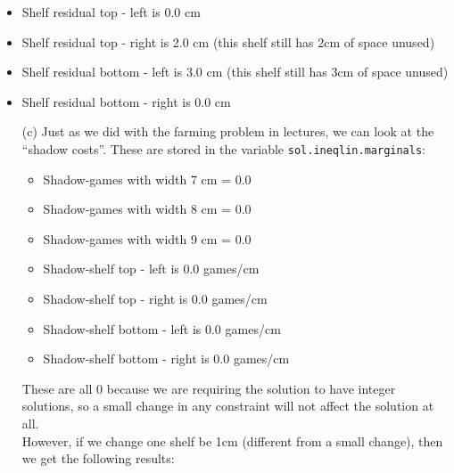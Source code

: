 \begin{enumerate}
\begin{itemize}
		\item Shelf residual  top - left  is  0.0 cm
		\item Shelf residual  top - right  is  2.0 cm \hfill (this shelf still has 2cm of space unused)
		\item Shelf residual  bottom - left  is  3.0 cm \hfill (this shelf still has 3cm of space unused)
		\item Shelf residual  bottom - right  is  0.0 cm
	\end{itemize}

\begin{enumerate}	
\item[(c)] Just as we did with the farming problem in lectures, we can look at the ``shadow costs''. These are stored in the variable \texttt{sol.ineqlin.marginals}:
	\begin{itemize}
		\item Shadow-games with width 7 cm = 0.0
		\item Shadow-games with width 8 cm = 0.0
		\item Shadow-games with width 9 cm = 0.0 \\
		
		\item Shadow-shelf  top - left  is  0.0 games/cm
		\item Shadow-shelf  top - right  is  0.0 games/cm
		\item Shadow-shelf  bottom - left  is  0.0 games/cm
		\item Shadow-shelf  bottom - right  is  0.0 games/cm
	\end{itemize}

These are all 0 because we are requiring the solution to have integer solutions, so a small change in any constraint will not affect the solution at all. \\

However, if we change one shelf be 1cm (different from a small change), then we get the following results:



\end{enumerate}
\end{enumerate}
